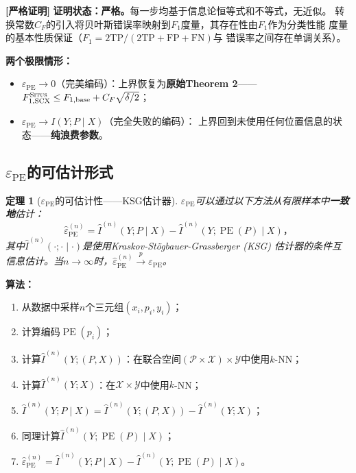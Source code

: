 \documentclass[11pt,a4paper]{article}
\newtheorem{theorem}{定理}[section]
\theoremstyle{remark}
\DeclareMathOperator{\PE}{PE}
\newcommand{\Y}{\mathcal{Y}}
\newcommand{\X}{\mathcal{X}}
\newcommand{\Ppos}{\mathcal{P}}
\newcommand{\Situs}{\textsc{Situs}}
\newcommand{\rigorous}{\textnormal{\textbf{[严格证明]}}}
\begin{document}
\rigorous{} \textbf{证明状态：严格。}每一步均基于信息论恒等式和不等式，无近似。
转换常数$C_F$的引入将贝叶斯错误率映射到$F_1$度量，其存在性由$F_1$作为分类性能
度量的基本性质保证（$F_1 = 2\text{TP}/(2\text{TP} + \text{FP} + \text{FN})$与
错误率之间存在单调关系）。

\textbf{两个极限情形：}
\begin{itemize}
    \item $\varepsilon_{\PE} \to 0$（完美编码）：上界恢复为\textbf{原始Theorem 2}——
          $F_{1,\text{SCX}}^{\Situs} \leq F_{1,\text{base}} + C_F\sqrt{\delta/2}$；
    \item $\varepsilon_{\PE} \to I(Y; P \mid X)$（完全失败的编码）：
          上界回到未使用任何位置信息的状态——\textbf{纯浪费参数}。
\end{itemize}

\subsection{$\varepsilon_{\PE}$的可估计形式}

\begin{theorem}[$\varepsilon_{\PE}$的可估计性——KSG估计器]
\label{thm:3.3.1}
$\varepsilon_{\PE}$可以通过以下方法从有限样本中\textbf{一致地}估计：
\begin{equation}
    \boxed{
    \hat{\varepsilon}_{\PE}^{(n)} = \hat{I}^{(n)}(Y; P \mid X)
                                 - \hat{I}^{(n)}(Y; \PE(P) \mid X)
    }，
\end{equation}
其中$\hat{I}^{(n)}(\cdot; \cdot \mid \cdot)$是使用Kraskov-St\"{o}gbauer-Grassberger (KSG)
估计器的条件互信息估计。当$n \to \infty$时，$\hat{\varepsilon}_{\PE}^{(n)} \xrightarrow{p} \varepsilon_{\PE}$。
\end{theorem}

\textbf{算法：}
\begin{enumerate}[label=(\arabic*)]
    \item 从数据中采样$n$个三元组$(x_i, p_i, y_i)$；
    \item 计算编码$\PE(p_i)$；
    \item 计算$\hat{I}^{(n)}(Y; (P, X))$：在联合空间$(\Ppos \times \X) \times \Y$中使用$k$-NN；
    \item 计算$\hat{I}^{(n)}(Y; X)$：在$\X \times \Y$中使用$k$-NN；
    \item $\hat{I}^{(n)}(Y; P \mid X) = \hat{I}^{(n)}(Y; (P, X)) - \hat{I}^{(n)}(Y; X)$；
    \item 同理计算$\hat{I}^{(n)}(Y; \PE(P) \mid X)$；
    \item $\hat{\varepsilon}_{\PE}^{(n)} = \hat{I}^{(n)}(Y; P \mid X) - \hat{I}^{(n)}(Y; \PE(P) \mid X)$。
\end{enumerate}
\end{document}
